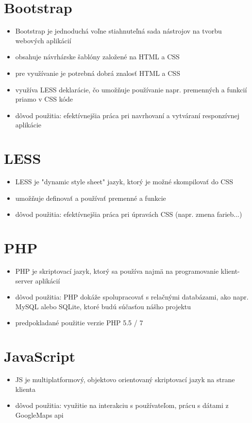 \documentclass[12pt,a4paper]{report}
\theoremstyle{definition}
\theoremstyle{remark}
\begin{document}
\section{Bootstrap}
\begin{itemize}
\item Bootstrap je jednoduchá voľne stiahnuteľná sada nástrojov na tvorbu webových aplikácií
\item obsahuje návrhárske šablóny založené na HTML a CSS
\item pre využívanie je potrebná dobrá znalosť HTML a CSS
\item využíva LESS deklarácie, čo umožňuje používanie napr. premenných a funkcií priamo v CSS kóde
\item dôvod použitia: efektívnejšia práca pri navrhovaní a vytváraní responzívnej aplikácie
\end{itemize}

\section{LESS}
\begin{itemize}
\item LESS je "dynamic style sheet"  jazyk, ktorý je možné skompilovať do CSS
\item umožňuje definovať a používať premenné a funkcie
\item dôvod použitia: efektívnejšia práca pri úpravách CSS (napr. zmena farieb...)
\end{itemize}

\section{PHP}
\begin{itemize}
\item PHP je skriptovací jazyk, ktorý sa používa najmä na programovanie klient-server aplikácií
\item dôvod použitia: PHP dokáže spolupracovať s relačnými databázami, ako napr. MySQL alebo SQLite, ktoré budú súčasťou nášho projektu
\item predpokladané použitie verzie PHP 5.5 / 7
\end{itemize}

\section{JavaScript}
\begin{itemize}
\item JS je multiplatformový, objektovo orientovaný skriptovací jazyk na strane klienta
\item dôvod použitia: využitie na interakciu s používateľom, prácu s dátami z GoogleMaps api 
\end{itemize}
\end{document}
